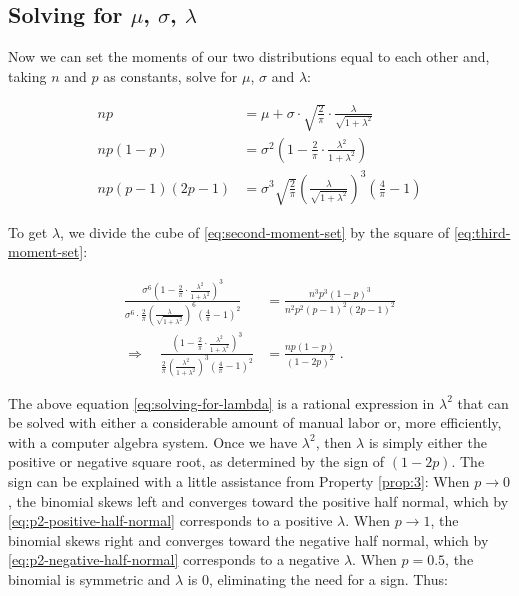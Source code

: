 \documentclass{article}
\begin{document}
\subsection{Solving for $\mu$, $\sigma$, $\lambda$}

Now we can set the moments of our two distributions equal to each other and,
taking $n$ and $p$ as constants, solve for $\mu$, $\sigma$ and $\lambda$:

\begin{subequations}
\begin{align}
  np &= \mu + \sigma \cdot \sqrt{\frac{2}{\pi}} \cdot \frac{\lambda}{\sqrt{1 + \lambda^2}} \label{eq:first-moment-set} \\
  np(1-p) &= \sigma^2 \left( 1 - \frac{2}{\pi} \cdot \frac{\lambda^2}{1 + \lambda^2} \right) \label{eq:second-moment-set} \\
  np(p-1)(2p-1) &= \sigma^3 \sqrt{\frac{2}{\pi}} \left( \frac{\lambda}{\sqrt{1 + \lambda^2}} \right)^3 \left( \frac{4}{\pi} - 1 \right) \label{eq:third-moment-set}
\end{align}
\end{subequations}

To get $\lambda$, we divide the cube of \eqref{eq:second-moment-set} by the
square of \eqref{eq:third-moment-set}:

\begin{align}
  \frac{\sigma^6 \left( 1 - \frac{2}{\pi} \cdot \frac{\lambda^2}{1 + \lambda^2} \right)^3}{\sigma^6 \cdot \frac{2}{\pi} \left( \frac{\lambda}{\sqrt{1 + \lambda^2}} \right)^6 \left(
    \frac{4}{\pi} - 1 \right)^2} &= \frac{n^3p^3(1-p)^3}{n^2p^2(p-1)^2(2p-1)^2} \nonumber \\
  \Rightarrow \quad \frac{\left( 1 - \frac{2}{\pi} \cdot \frac{\lambda^2}{1+\lambda^2} \right)^3}{\frac{2}{\pi} \left( \frac{\lambda^2}{1+\lambda^2} \right)^3 \left( \frac{4}{\pi} - 1
    \right)^2} &= \frac{np(1-p)}{(1-2p)^2} \;. \label{eq:solving-for-lambda}
\end{align}

The above equation \eqref{eq:solving-for-lambda} is a rational expression in
$\lambda^2$ that can be solved with either a considerable amount of manual
labor or, more efficiently, with a computer algebra system. Once we have
$\lambda^2$, then $\lambda$ is simply either the positive or negative square
root, as determined by the sign of $(1-2p)$. The sign can be explained with a
little assistance from Property \ref{prop:3}: When $p \to 0$, the binomial
skews left and converges toward the positive half normal, which by
\eqref{eq:p2-positive-half-normal} corresponds to a positive $\lambda$. When $p
\to 1$, the binomial skews right and converges toward the negative half normal,
which by \eqref{eq:p2-negative-half-normal} corresponds to a negative
$\lambda$. When $p = 0.5$, the binomial is symmetric and $\lambda$ is 0,
eliminating the need for a sign. Thus:
\end{document}
